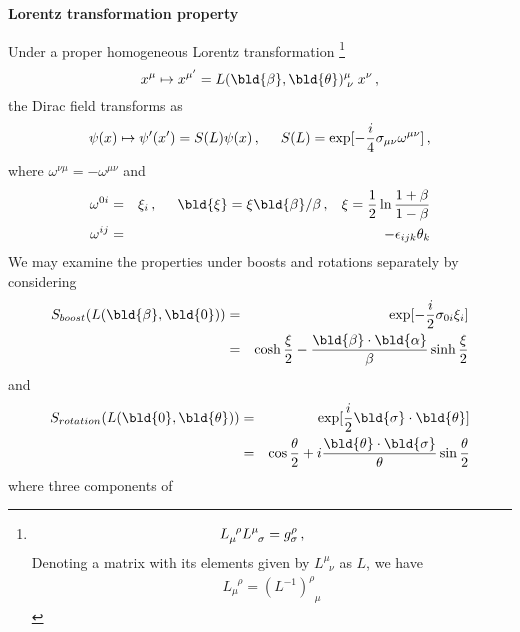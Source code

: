 \bigskip
\noindent
{\bf Lorentz transformation property}

Under a proper homogeneous Lorentz transformation
\footnote{%
\begin{eqnarray*}
L_\mu^{\;\;\rho} L^\mu_{\;\;\sigma} = g^\rho_\sigma\,,
\hspace{5mm}
\end{eqnarray*}
Denoting a matrix with its elements given by $L^\mu_{\;\;\nu}$ as $L$,
we have
\begin{eqnarray*}
L_\mu^{\;\;\rho} = (L^{-1})^\rho_{\;\;\mu}
\end{eqnarray*}
}%
\begin{equation}
x^\mu \mapsto x^{\mu'} = L(\bld{\beta}, \bld{\theta})^\mu_{\;\nu}\; x^\nu\,,
\end{equation}
the Dirac field transforms as
\begin{eqnarray}
\psi(x) \mapsto \psi'(x') = S(L) \psi(x)\,,
\hspace{5mm}
S(L) = \exp[ -\frac{i}{4}\sigma_{\mu \nu} \omega^{\mu \nu}]\,,
\end{eqnarray}
where $\omega^{\nu \mu} = -\omega^{\mu \nu}$ and
\begin{eqnarray}
\omega^{0i} &=& \xi_i\,,
\hspace{5mm}
\bld{\xi} = \xi \bld{\beta}/\beta\,,
\hspace{3mm}
\xi = \frac{1}{2} \ln \frac{1+\beta}{1-\beta}
\\
\omega^{ij}
&=&
-\epsilon_{ijk} \theta_k
\end{eqnarray}
We may examine the properties under boosts and rotations separately by considering
\begin{eqnarray}
S_{boost}(L(\bld{\beta},\bld{0})) &=& \exp[
-\frac{i}{2}\sigma_{0i}\xi_i ]
\\
&=&
\cosh \frac{\xi}{2} - \frac{\bld{\beta}\cdot \bld{\alpha}}{\beta} \sinh \frac{\xi}{2}
\end{eqnarray}
and
\begin{eqnarray}
S_{rotation}(L(\bld{0},\bld{\theta}))&=& \exp[
\frac{i}{2} \bld{\sigma}\cdot \bld{\theta} ]
\\
&=&
\cos \frac{\theta}{2}
+ i \frac{\bld{\theta}\cdot\bld{\sigma}}{\theta} \sin \frac{\theta}{2}
\end{eqnarray}
where three components of
